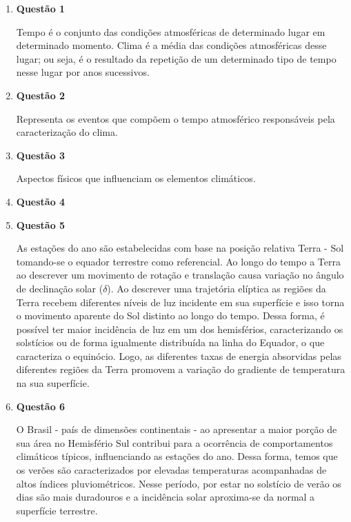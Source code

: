 \documentclass[a4paper, 12pt]{article}
\begin{document}
	\begin{enumerate}
		\item[]\textbf{Questão 1} 
		
		\hspace{1cm}Tempo é o conjunto das condições atmosféricas de determinado lugar em determinado momento. Clima é a média das condições atmosféricas desse lugar; ou seja, é o resultado da repetição de um determinado tipo de tempo nesse lugar por anos sucessivos.
		
		\item[]\textbf{Questão 2} 
		
		\hspace{1cm}Representa os eventos que compõem o tempo atmosférico responsáveis pela caracterização do clima.
		
		\item[]\textbf{Questão 3} 
		
		\hspace{1cm}Aspectos físicos que influenciam os elementos climáticos.
		
		\item[]\textbf{Questão 4}
		
		\item[]\textbf{Questão 5} 
		
		\hspace{1cm}As estações do ano são estabelecidas com base na posição relativa Terra - Sol tomando-se o equador terrestre como referencial. Ao longo do tempo a Terra ao descrever um movimento de rotação e translação causa variação no ângulo de declinação solar ($\delta$). Ao descrever uma trajetória elíptica as regiões da Terra recebem diferentes níveis de luz incidente em sua superfície e isso torna o movimento aparente do Sol distinto ao longo do tempo. Dessa forma, é possível ter maior incidência de luz em um dos hemisférios, caracterizando os solstícios ou de forma igualmente distribuída na linha do Equador, o que caracteriza o equinócio. Logo, as diferentes taxas de energia absorvidas pelas diferentes regiões da Terra promovem a variação do gradiente de temperatura na sua superfície.
		
		\item[]\textbf{Questão 6} 
		
		\hspace{1cm}O Brasil - país de dimensões continentais - ao apresentar a maior porção de sua área no Hemisfério Sul contribui para a ocorrência de comportamentos climáticos típicos, influenciando as estações do ano. Dessa forma, temos que os verões são caracterizados por elevadas temperaturas acompanhadas de altos índices pluviométricos. Nesse período, por estar no solstício de verão os dias são mais duradouros e a incidência solar aproxima-se da normal a superfície terrestre.
		

\end{enumerate}
\end{document}
